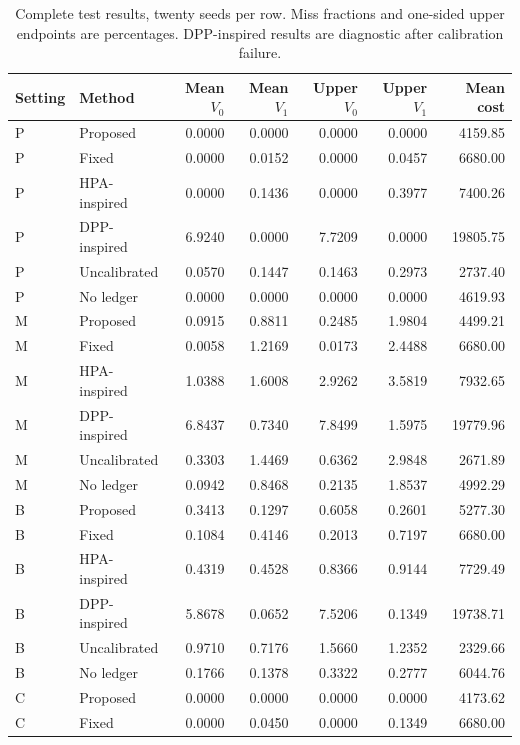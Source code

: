\documentclass{IEEEoj}
\renewcommand{\arraystretch}{1.15}
\begin{document}
\begin{table}[!htbp]\centering\fontsize{8}{9}\selectfont\renewcommand{\arraystretch}{1.06}
\caption{Complete test results, twenty seeds per row. Miss fractions and one-sided upper endpoints are percentages. DPP-inspired results are diagnostic after calibration failure.}\label{tab:allresults}
\begin{tabular}{llrrrrr}
\toprule Setting & Method & Mean $V_0$ & Mean $V_1$ & Upper $V_0$ & Upper $V_1$ & Mean cost\\\midrule
P & Proposed & 0.0000 & 0.0000 & 0.0000 & 0.0000 & 4159.85 \\
P & Fixed & 0.0000 & 0.0152 & 0.0000 & 0.0457 & 6680.00 \\
P & HPA-inspired & 0.0000 & 0.1436 & 0.0000 & 0.3977 & 7400.26 \\
P & DPP-inspired & 6.9240 & 0.0000 & 7.7209 & 0.0000 & 19805.75 \\
P & Uncalibrated & 0.0570 & 0.1447 & 0.1463 & 0.2973 & 2737.40 \\
P & No ledger & 0.0000 & 0.0000 & 0.0000 & 0.0000 & 4619.93 \\
\addlinespace
M & Proposed & 0.0915 & 0.8811 & 0.2485 & 1.9804 & 4499.21 \\
M & Fixed & 0.0058 & 1.2169 & 0.0173 & 2.4488 & 6680.00 \\
M & HPA-inspired & 1.0388 & 1.6008 & 2.9262 & 3.5819 & 7932.65 \\
M & DPP-inspired & 6.8437 & 0.7340 & 7.8499 & 1.5975 & 19779.96 \\
M & Uncalibrated & 0.3303 & 1.4469 & 0.6362 & 2.9848 & 2671.89 \\
M & No ledger & 0.0942 & 0.8468 & 0.2135 & 1.8537 & 4992.29 \\
\addlinespace
B & Proposed & 0.3413 & 0.1297 & 0.6058 & 0.2601 & 5277.30 \\
B & Fixed & 0.1084 & 0.4146 & 0.2013 & 0.7197 & 6680.00 \\
B & HPA-inspired & 0.4319 & 0.4528 & 0.8366 & 0.9144 & 7729.49 \\
B & DPP-inspired & 5.8678 & 0.0652 & 7.5206 & 0.1349 & 19738.71 \\
B & Uncalibrated & 0.9710 & 0.7176 & 1.5660 & 1.2352 & 2329.66 \\
B & No ledger & 0.1766 & 0.1378 & 0.3322 & 0.2777 & 6044.76 \\
\addlinespace
C & Proposed & 0.0000 & 0.0000 & 0.0000 & 0.0000 & 4173.62 \\
C & Fixed & 0.0000 & 0.0450 & 0.0000 & 0.1349 & 6680.00 \\

\end{tabular}
\end{table}
\end{document}
